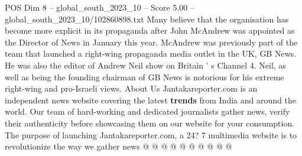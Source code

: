 \begin{textsample}{POS Dim 8 – global\_south\_2023\_10 – Score 5.00 – global\_south\_2023\_10/102860898.txt}
Many believe that the organisation has become more explicit in its propaganda after John McAndrew was appointed as the Director of News in January this year.
McAndrew was previously part of the team that launched a right-wing propaganda media outlet in the UK, GB News.
He was also the editor of Andrew Neil show on Britain ' s Channel 4.
Neil, as well as being the founding chairman of GB News is notorious for his extreme right-wing and pro-Israeli views.
About Us Jantakareporter.com is an independent news website covering the latest \textbf{trends} from India and around the world.
Our team of hard-working and dedicated journalists gather news, verify their authenticity before showcasing them on our website for your consumption.
The purpose of launching Jantakareporter.com, a 24? 7 multimedia website is to revolutionize the way we gather news @ @ @ @ @ @ @ @ @ @

\end{textsample}
